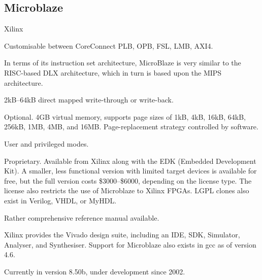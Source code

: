 \subsection{Microblaze}
\begin{description}[style=nextline]
\item[Developer] Xilinx
\item[Bus Used] Customisable between CoreConnect PLB, OPB, FSL, LMB, AXI4.
\item[Architecture] In terms of its instruction set architecture, MicroBlaze is very similar to the RISC-based DLX architecture, which in turn is based upon the MIPS architecture.
\item[Cache] 2kB--64kB direct mapped write-through or write-back.
\item[MMU] Optional. 4GB virtual memory, supports page sizes of 1kB, 4kB, 16kB, 64kB, 256kB, 1MB, 4MB, and 16MB. Page-replacement strategy controlled by software.
\item[User Levels] User and privileged modes.
\item[License] Proprietary. Available from Xilinx along with the EDK (Embedded Development Kit). A smaller, less functional version with limited target devices is available for free, but the full version costs \$3000--\$6000, depending on the license type. The license also restricts the use of Microblaze to Xilinx FPGAs. LGPL clones also exist in Verilog, VHDL, or MyHDL.\cite{mb-clone}
\item[Documentation] Rather comprehensive reference manual available.\cite{mb-doc}
\item[Toolchain] Xilinx provides the Vivado design suite, including an IDE, SDK, Simulator, Analyser, and Synthesiser. Support for Microblaze also exists in gcc as of version 4.6.
\item[Maturity] Currently in version 8.50b, under development since 2002.
\end{description}


